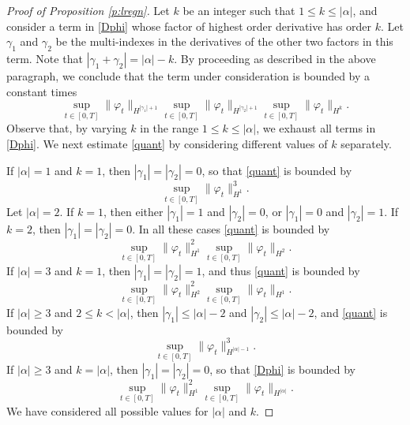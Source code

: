 \documentclass[11pt,a4paper,DIV11]{scrartcl}	%
\begin{document}
\begin{proof}[Proof of Proposition \ref{p:lregn}]
  Let $k$ be an integer such that $1 \le k \le |\alpha|$, and consider a
  term in \eqref{Dphi} whose factor of highest order derivative has order
  $k$. Let $\gamma_1$ and $\gamma_2$ be the multi-indexes in the derivatives
  of the other two factors in this term. Note that $|\gamma_1 + \gamma_2| =
  |\alpha|-k$. By proceeding as described in the above paragraph, we
  conclude that the term under consideration is bounded by a constant times
  \begin{equation} \label{quant}
    \sup_{t \in [0,T]} \| \varphi_t \|_{H^{|\gamma_1|+1}} \sup_{t \in [0,T]}
    \| \varphi_t \|_{H^{|\gamma_2|+1}} \sup_{t \in [0,T]} \| \varphi_t
    \|_{H^k}.
  \end{equation}
  Observe that, by varying $k$ in the range $1 \le k \le |\alpha|$, we
  exhaust all terms in \eqref{Dphi}. We next estimate \eqref{quant} by
  considering different values of $k$ separately. 


  If $|\alpha|=1$ and $k=1$, then $|\gamma_1|=|\gamma_2|=0$, so that
  \eqref{quant} is bounded by
  \[
    \sup_{t \in [0,T]} \| \varphi_t \|_{H^1}^3.
  \]
  Let $|\alpha|=2$. If $k=1$, then either $|\gamma_1|=1$ and $|\gamma_2|=0$,
  or $|\gamma_1|=0$ and $|\gamma_2|=1$. If $k=2$, then $|\gamma_1| =
  |\gamma_2| = 0$. In all these cases \eqref{quant} is bounded by
  \[
    \sup_{t \in [0,T]} \| \varphi_t \|_{H^1}^2 \sup_{t \in [0,T]} \|
    \varphi_t \|_{H^2}.
  \]
  If $|\alpha| = 3$ and $k = 1$, then $|\gamma_1|=|\gamma_2|=1$, and thus
  \eqref{quant} is bounded by
  \[
    \sup_{t \in [0,T]} \| \varphi_t \|_{H^2}^2 \sup_{t \in [0,T]} \|
    \varphi_t \|_{H^1}.
  \]
  If $|\alpha| \ge 3$ and $2 \le k < |\alpha|$, then $|\gamma_1| \le
  |\alpha| - 2 $ and $|\gamma_2| \le |\alpha|-2$, and \eqref{quant} is
  bounded by
  \[
    \sup_{t \in [0,T]} \| \varphi_t \|_{H^{|\alpha|-1}}^3.
  \]
  If $|\alpha| \ge 3$ and $k=|\alpha|$, then $|\gamma_1|=|\gamma_2|=0$, so
  that \eqref{Dphi} is bounded by
  \[
    \sup_{t \in [0,T]} \| \varphi_t \|_{H^1}^2 \sup_{t \in [0,T]} \|
    \varphi_t \|_{H^{|\alpha|}}.
  \]
  We have considered all possible values for $|\alpha|$ and $k$.
  

\end{proof}
\end{document}
